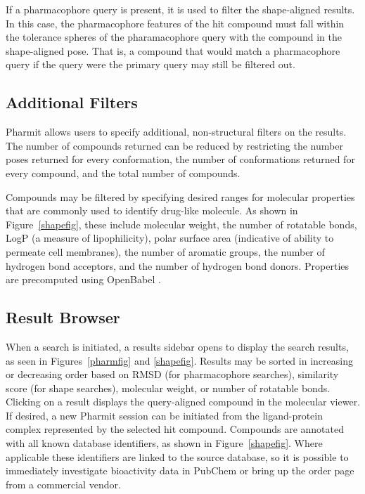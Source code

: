 If a pharmacophore query is present, it is used to filter the shape-aligned results. In this case, the pharmacophore features of the hit compound must fall within the tolerance spheres of the pharamacophore query with the compound in the shape-aligned pose. That is, a compound that would match a pharmacophore query if the query were the primary query may still be filtered out.
 
\subsection{Additional Filters}
Pharmit allows users to specify additional, non-structural filters on the results. The number of compounds returned can be reduced by restricting the number poses returned for every conformation, the number of conformations returned for every compound, and the total number of compounds.

Compounds may be filtered by specifying desired ranges for molecular properties that are commonly used to identify drug-like molecule.
As shown in Figure~\ref{shapefig}, these include molecular weight, the number of rotatable bonds, LogP (a measure of lipophilicity), polar surface area (indicative of ability to permeate cell membranes), the number of aromatic groups, the number of hydrogen bond acceptors, and the number of hydrogen bond donors.  Properties are precomputed using OpenBabel \cite{O_Boyle_2011}.

\subsection{Result Browser}
When a search is initiated, a results sidebar opens to display the search results, as seen in Figures~\ref{pharmfig} and \ref{shapefig}. Results may be sorted in increasing or decreasing order based on RMSD (for pharmacophore searches), similarity score (for shape searches), molecular weight, or number of rotatable bonds. Clicking on a result displays the query-aligned compound in the molecular viewer.  If desired, a new Pharmit session can be initiated from the ligand-protein complex represented by the selected hit compound.
Compounds are annotated with all known database identifiers, as shown in Figure~\ref{shapefig}. Where applicable these identifiers are linked to the source database, so it is possible to immediately investigate bioactivity data in PubChem or bring up the order page from a commercial vendor.